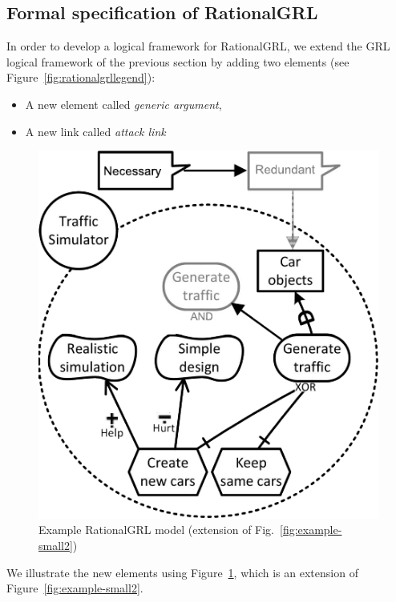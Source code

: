 \subsection{Formal specification of RationalGRL}
\label{sect:formalframework:rationalgrl}

In order to develop a logical framework for RationalGRL, we extend the GRL logical framework of the previous section by adding two elements (see Figure~\ref{fig:rationalgrllegend}):
\begin{itemize}
\item A new element called \emph{generic argument},
\item A new link called \emph{attack link}
\end{itemize}

\begin{figure}[ht]
\centering
\includegraphics[width=\columnwidth]{img/Example1-new-attack.pdf}
\caption{Example RationalGRL model (extension of Fig.~\ref{fig:example-small2})}
\label{fig:example-small3}
\end{figure} 

We illustrate the new elements using Figure~\ref{fig:example-small3}, which is an extension of Figure~\ref{fig:example-small2}. 

